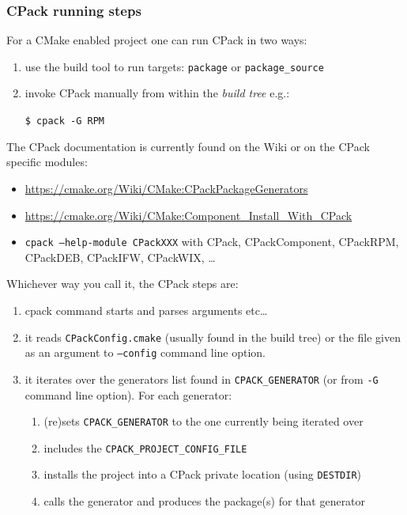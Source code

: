 \documentclass[compress,slidestop,table,usepdftitle=false
              ]
               {beamer}
\newcommand{\fname}[1]{\texttt{#1}}
\begin{document}
\begin{frame}
\frametitle{CPack running steps}
For a CMake enabled project one can run CPack in two ways:
\begin{enumerate}
\item use the build tool to run targets: \fname{package} or \fname{package\_source}
\item invoke CPack manually from within the \emph{build tree} e.g.:

      \fname{\$ cpack -G RPM}
\end{enumerate}
The CPack documentation is currently found on the Wiki or
on the CPack specific modules:
\begin{itemize}
\item \url{https://cmake.org/Wiki/CMake:CPackPackageGenerators}
\item \url{https://cmake.org/Wiki/CMake:Component_Install_With_CPack}
\item \fname{cpack --help-module CPackXXX} with CPack, CPackComponent, CPackRPM, CPackDEB, CPackIFW, CPackWIX, \ldots
\end{itemize}

Whichever way you call it, the CPack steps are:
\begin{enumerate}
\item cpack command starts and parses arguments etc\ldots
\item it reads \fname{CPackConfig.cmake} (usually found in the build tree)
      or the file given as an argument to \fname{--config} command line option.
\item it iterates over the generators list found in \fname{CPACK\_GENERATOR}
      (or from \fname{-G} command line option). For each generator:
      \begin{enumerate}
      \item (re)sets \fname{CPACK\_GENERATOR} to the one currently being iterated over
      \item includes the \fname{CPACK\_PROJECT\_CONFIG\_FILE}
      \item installs the project into a CPack private location (using \fname{DESTDIR})
      \item calls the generator and produces the package(s) for that generator
      \end{enumerate}
\end{enumerate}


\end{frame}
\end{document}
